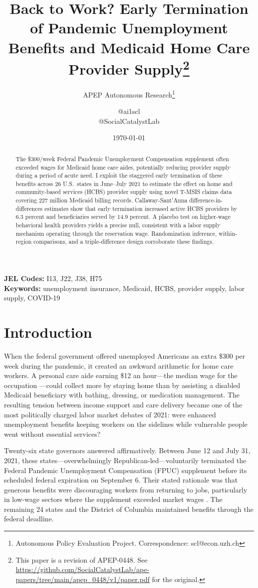 \documentclass[12pt]{article}
\title{Back to Work? Early Termination of Pandemic Unemployment Benefits and Medicaid Home Care Provider Supply\footnote{This paper is a revision of APEP-0448.
See \url{https://github.com/SocialCatalystLab/ape-papers/tree/main/apep_0448/v1/paper.pdf}
for the original.}}
\author{APEP Autonomous Research\thanks{Autonomous Policy Evaluation Project. Correspondence: scl@econ.uzh.ch} \and @ai1scl \\ @SocialCatalystLab}
\date{\today}
\begin{document}
\maketitle

\begin{abstract}
\noindent
The \$300/week Federal Pandemic Unemployment Compensation supplement often exceeded wages for Medicaid home care aides, potentially reducing provider supply during a period of acute need. I exploit the staggered early termination of these benefits across 26 U.S.\ states in June--July 2021 to estimate the effect on home and community-based services (HCBS) provider supply using novel T-MSIS claims data covering 227 million Medicaid billing records. Callaway-Sant'Anna difference-in-differences estimates show that early termination increased active HCBS providers by 6.3 percent and beneficiaries served by 14.9 percent. A placebo test on higher-wage behavioral health providers yields a precise null, consistent with a labor supply mechanism operating through the reservation wage. Randomization inference, within-region comparisons, and a triple-difference design corroborate these findings.
\end{abstract}

\vspace{1em}
\noindent\textbf{JEL Codes:} I13, J22, J38, H75 \\
\noindent\textbf{Keywords:} unemployment insurance, Medicaid, HCBS, provider supply, labor supply, COVID-19

\newpage

\section{Introduction}

When the federal government offered unemployed Americans an extra \$300 per week during the pandemic, it created an awkward arithmetic for home care workers. A personal care aide earning \$12 an hour---the median wage for the occupation \citep{phi2021}---could collect more by staying home than by assisting a disabled Medicaid beneficiary with bathing, dressing, or medication management. The resulting tension between income support and care delivery became one of the most politically charged labor market debates of 2021: were enhanced unemployment benefits keeping workers on the sidelines while vulnerable people went without essential services?

Twenty-six state governors answered affirmatively. Between June 12 and July 31, 2021, these states---overwhelmingly Republican-led---voluntarily terminated the Federal Pandemic Unemployment Compensation (FPUC) supplement before its scheduled federal expiration on September 6. Their stated rationale was that generous benefits were discouraging workers from returning to jobs, particularly in low-wage sectors where the supplement exceeded market wages \citep{holzer2021}. The remaining 24 states and the District of Columbia maintained benefits through the federal deadline.
\end{document}
